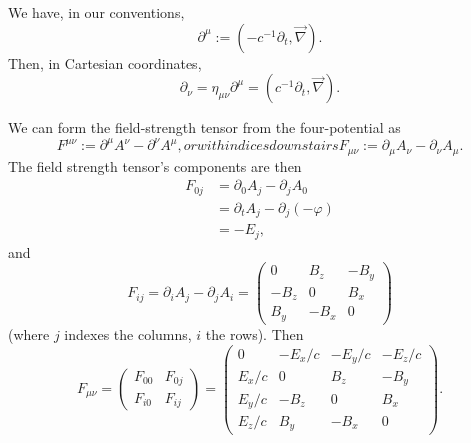 We have, in our conventions,
\begin{equation}
\partial^{\mu} := (-c^{-1}\partial_{t}, \vec{\nabla}).
\end{equation}
Then, in Cartesian coordinates,
\begin{equation}
\partial_{\nu} = \eta_{\mu\nu}\partial^{\mu} = (c^{-1}\partial_{t}, \vec{\nabla}).
\end{equation}

We can form the field-strength tensor from the four-potential as
\begin{subequations}
\begin{equation}
F^{\mu\nu} := \partial^{\mu}A^{\nu} - \partial^{\nu}A^{\mu},
\end{equation}
or with indices downstairs
\begin{equation}
F_{\mu\nu} := \partial_{\mu}A_{\nu} - \partial_{\nu}A_{\mu}.
\end{equation}
\end{subequations}
The field strength tensor's components are then
\begin{subequations}
\begin{align}
F_{0j} &= \partial_{0}A_{j} - \partial_{j}A_{0}\\
&= \partial_{t}A_{j} - \partial_{j}(-\varphi)\\
&= -E_{j},
\end{align}
\end{subequations}
and
\begin{equation}
F_{ij} = \partial_{i}A_{j} - \partial_{j}A_{i} = \begin{pmatrix}
 0     &  B_{z} & -B_{y}\\
-B_{z} &  0     & B_{x}\\
 B_{y} & -B_{x} & 0
\end{pmatrix}
\end{equation}
(where $j$ indexes the columns, $i$ the rows). Then
\begin{equation}
F_{\mu\nu} = \begin{pmatrix}F_{00} & F_{0j}\\
F_{i0} & F_{ij}
\end{pmatrix} = \begin{pmatrix}
 0       & -E_{x}/c & -E_{y}/c & -E_{z}/c\\
 E_{x}/c &  0       &  B_{z}   & -B_{y}\\
 E_{y}/c & -B_{z}   &  0       &  B_{x}\\
 E_{z}/c &  B_{y}   & -B_{x}   &  0
\end{pmatrix}.
\end{equation}

